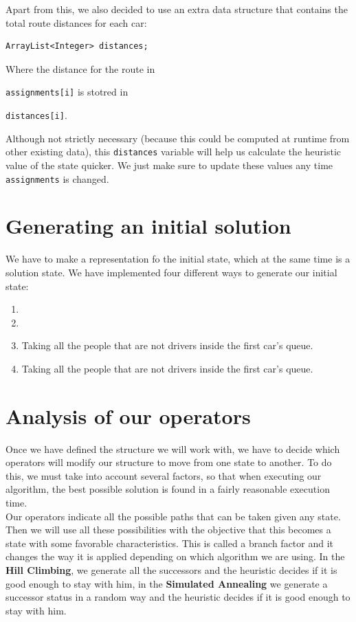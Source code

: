 \documentclass[12]{article}
\begin{document}
Apart from this, we also decided to use an extra data structure that contains the total route distances for each car:

\begin{lstlisting}
ArrayList<Integer> distances;
\end{lstlisting}

Where the distance for the route in \raggedright\lstinline{assignments[i]} is stotred in \raggedright\lstinline{distances[i]}.

Although not strictly necessary (because this could be computed at runtime from other existing data), this \lstinline{distances} variable will help us calculate the heuristic value of the state quicker. We just make sure to update these values any time \lstinline{assignments} is changed.


\section{Generating an initial solution}
We have to make a representation fo the initial state, which at the same time is a solution state. We have implemented four different ways to generate our initial state:
\begin{enumerate}
\item 
\item 
\item Taking all the people that are not drivers inside the first car's queue.
\item Taking all the people that are not drivers inside the first car's queue.
\end{enumerate} 
\section{Analysis of our operators}

Once we have defined the structure we will work with, we have to decide which operators will modify our structure to move from one  state to another. To do this, we must take into account several factors, so that when executing our algorithm, the best possible solution is found in a fairly reasonable execution time. 
\\
Our operators indicate all the possible paths that can be taken given any state. Then we will use all these possibilities with the objective that this becomes a state with some favorable characteristics. This is called a branch factor and it changes the way it is applied depending on which algorithm we are using. In the \textbf{Hill Climbing}, we generate all the successors and the heuristic decides if it is good enough to stay with him, in the \textbf{Simulated Annealing} we generate a successor status in a random way and the heuristic decides if it is good enough to stay with him. 
\\
\medskip
\end{document}

